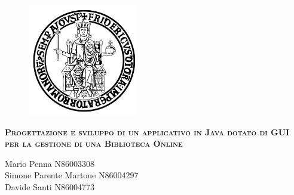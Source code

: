 \documentclass{report}
\begin{document}
    \begin{figure}[htbp!]
        \begin{center}
            \includegraphics[width=.25\textwidth]{Immagini/FedericoII.png}
        \end{center}
    \end{figure}
    
    \begin{center}
        {\scshape\Large\bfseries Progettazione e sviluppo di un applicativo in Java dotato di GUI per la gestione di una Biblioteca Online}
    \end{center}

    \begin{center}
        Mario Penna N86003308 \\ Simone Parente Martone N86004297 \\ Davide Santi N86004773
    \end{center}
    
    \newpage
    
    \tableofcontents
    
    
    
    
\end{document}
